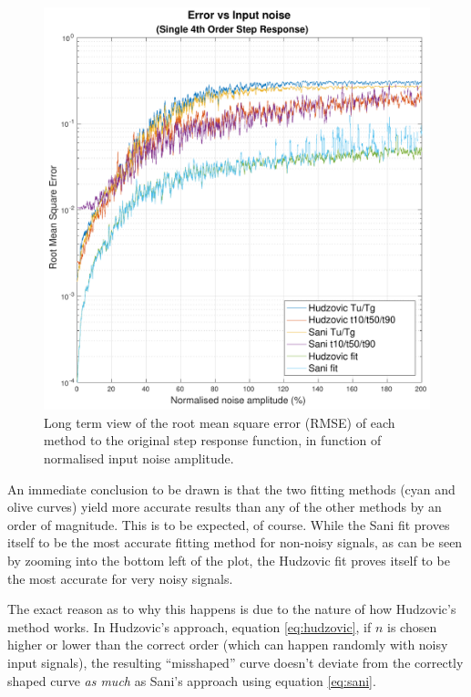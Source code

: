 \begin{figure}
    \includegraphics[width=\linewidth]{images/error_noise_long_term}
    \caption{Long term view of the root mean square error (RMSE) of each method to the original step response function, in function of normalised input noise amplitude.}
    \label{fig:error_noise_long_term}
\end{figure}

An  immediate  conclusion  to be drawn is that the two fitting methods (cyan and
olive curves) yield more accurate results than any  of  the  other methods by an
order of magnitude. This is to be expected, of course. While the Sani fit proves
itself to be  the  most accurate fitting method for non-noisy signals, as can be
seen by zooming into the bottom left of the plot, the Hudzovic fit proves itself
to be the most accurate for very noisy signals.

The exact reason as to why this happens is due  to  the nature of how Hudzovic's
method works. In Hudzovic's  approach,  equation  \ref{eq:hudzovic},  if  $n$ is
chosen higher or lower  than  the  correct order (which can happen randomly with
noisy input signals), the resulting ``misshaped'' curve doesn't deviate from the
correctly  shaped curve \textit{as  much}  as  Sani's  approach  using  equation
\ref{eq:sani}.  

